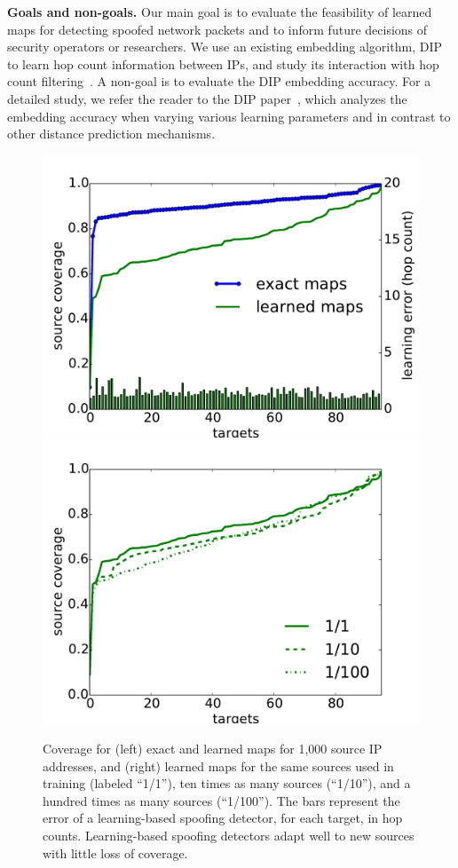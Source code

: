 {\bf Goals and non-goals.} Our main goal is to evaluate the feasibility of learned maps for detecting spoofed network packets and to inform future decisions of security operators or researchers. We use an existing embedding algorithm, DIP~\citep{dip} to learn hop count information between IPs, and study its interaction with hop count filtering~\citep{hcf}. A non-goal is to evaluate the DIP embedding accuracy. For a detailed study, we refer the reader to the DIP paper~\citep{dip}, which analyzes the embedding accuracy when varying various learning parameters and in contrast to other distance prediction mechanisms.
\begin{figure}[t]
	\centering
	\includegraphics[width=.49\linewidth]{Graph/spoof/upperbound-upperbound-caida-jun2015-source-to-monitor-ttls-2000files-sample1000.pdf}
	\includegraphics[width=.49\linewidth]{Graph/spoof/coverage.pdf}
	\caption{Coverage for (left) exact and learned maps for 1,000 source IP addresses, and (right) learned maps for the same sources used in training (labeled ``1/1''), ten times as many sources (``1/10''), and a hundred times as many sources (``1/100''). The bars represent the error of a learning-based spoofing detector, for each target, in hop counts. Learning-based spoofing detectors adapt well to new sources with little loss of coverage.}
	\label{fig:upperbound}
	\vspace{0.5cm}
\end{figure}

